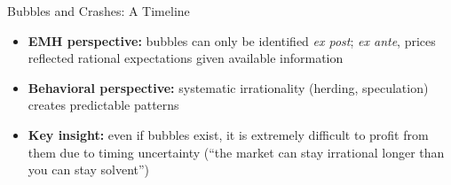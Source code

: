 \documentclass[9pt, aspectratio=169, t]{beamer}
\theoremstyle{definition}
\newenvironment{cminipage}[1]{%
    \par\noindent\hfill\begin{minipage}{#1}\ignorespaces
}{%
    \end{minipage}\hfill\null\par
}
\begin{document}
\begin{frame}{Bubbles and Crashes: A Timeline}
\begin{cminipage}{0.95\textwidth}
\begin{center}
\end{center}

\vspace{0.3cm}
\begin{itemize}\setlength{\itemsep}{0pt}
    \item \textbf{EMH perspective:} bubbles can only be identified \textit{ex post}; \textit{ex ante}, prices reflected rational expectations given available information
    \item \textbf{Behavioral perspective:} systematic irrationality (herding, speculation) creates predictable patterns
    \item \textbf{Key insight:} even if bubbles exist, it is extremely difficult to profit from them due to timing uncertainty (``the market can stay irrational longer than you can stay solvent'')
\end{itemize}
\end{cminipage}
\end{frame}
\end{document}
